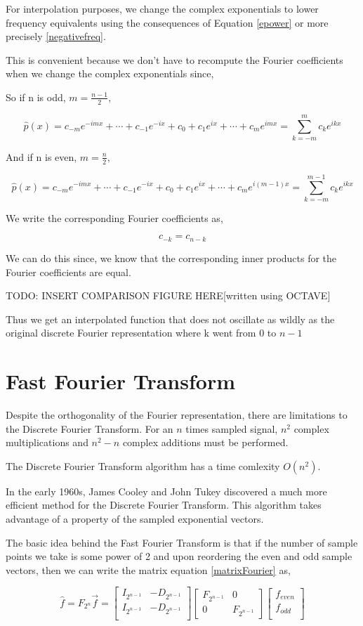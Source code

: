 \documentclass[11pt]{amsart}
\theoremstyle{definition}
\theoremstyle{remark}
\numberwithin{equation}{section}
\begin{document}
For interpolation purposes, we change the complex exponentials to lower frequency equivalents using the consequences of Equation \ref{epower} or more precisely \ref{negativefreq}.

This is convenient because we don't have to recompute the Fourier coefficients when we change the complex exponentials since,

So if n is odd, $m = \frac{n-1}{2},$

\[
	\hat{p}(x) = c_{-m} e^{-imx} + \cdots + c_{-1} e^{-ix} + c_0 + c_1e^{ix} + \cdots + c_me^{imx} = \sum_{k = -m}^{m} c_k e^{ikx}
\]

And if n is even, $m = \frac{n}{2},$

\[
	\hat{p}(x) = c_{-m} e^{-imx} + \cdots + c_{-1} e^{-ix} + c_0 + c_1e^{ix} + \cdots + c_me^{i(m-1)x} = \sum_{k = -m}^{m-1} c_k e^{ikx}
\]

We write the corresponding Fourier coefficients as,

\[
	c_{-k} = c_{n-k}
\]

We can do this since, we know that the corresponding inner products for the Fourier coefficients are equal.

TODO: INSERT COMPARISON FIGURE HERE[written using OCTAVE]

Thus we get an interpolated function that does not oscillate as wildly as the original discrete Fourier representation where k went from $0$ to $n-1$

\section{Fast Fourier Transform}
Despite the orthogonality of the Fourier representation, there are limitations to the Discrete Fourier Transform. For an $n$ times sampled signal, $n^2$ complex multiplications and $n^2 - n$ complex additions must be performed.

The Discrete Fourier Transform algorithm has a time comlexity $O(n^2)$.

In the early 1960s, James Cooley and John Tukey discovered a much more efficient method for the Discrete Fourier Transform. This algorithm takes advantage of a property of the sampled exponential vectors.

The basic idea behind the Fast Fourier Transform is that if the number of sample points we take is some power of 2 and upon reordering the even and odd sample vectors, then we can write the matrix equation \ref{matrixFourier} as,

\[
	\hat{f} = F_{2^n} \vec{f} = \begin{bmatrix}
		I_{2^{n-1}} & -D_{2^{n-1}} \\
		I_{2^{n-1}} & -D_{2^{n-1}} \\
	\end{bmatrix}
	\begin{bmatrix}
		F_{2^{n-1}} & 0 \\
	0 & F_{2^{n-1}}
	\end{bmatrix}
	\begin{bmatrix}
		f_{even} \\
		f_{odd} \\
	\end{bmatrix}
\]
\end{document}

